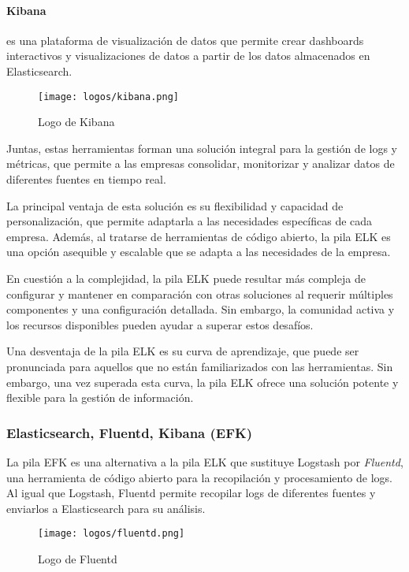 \paragraph{Kibana} es una plataforma de visualización de datos que permite
crear dashboards interactivos y visualizaciones de datos a partir de los datos
almacenados en Elasticsearch.

\begin{figure}[H]
	\centering
	\texttt{[image: logos/kibana.png]}
	\caption{Logo de Kibana~\textregistered}
\end{figure}

Juntas, estas herramientas forman una solución integral para la
gestión de logs y métricas, que permite a las empresas consolidar, monitorizar y
analizar datos de diferentes fuentes en tiempo real.

La principal ventaja de esta solución es su flexibilidad y capacidad de
personalización, que permite adaptarla a las necesidades específicas de cada
empresa. Además, al tratarse de herramientas de código abierto, la pila ELK es
una opción asequible y escalable que se adapta a las necesidades de la empresa.

En cuestión a la complejidad, la pila ELK puede resultar más compleja de
configurar y mantener en comparación con otras soluciones al requerir múltiples
componentes y una configuración detallada. Sin embargo, la comunidad activa y
los recursos disponibles pueden ayudar a superar estos desafíos.

Una desventaja de la pila ELK es su curva de aprendizaje, que puede ser
pronunciada para aquellos que no están familiarizados con las herramientas. Sin
embargo, una vez superada esta curva, la pila ELK ofrece una solución potente y
flexible para la gestión de información.


\subsubsection{Elasticsearch, Fluentd, Kibana (EFK)}
La pila EFK es una alternativa a la pila ELK que sustituye Logstash por
\textit{Fluentd}, una herramienta de código abierto para la recopilación y
procesamiento de logs. Al igual que Logstash, Fluentd permite recopilar logs de
diferentes fuentes y enviarlos a Elasticsearch para su análisis.

\begin{figure}[H]
	\centering
	\texttt{[image: logos/fluentd.png]}
	\caption{Logo de Fluentd~\textregistered}
\end{figure}

